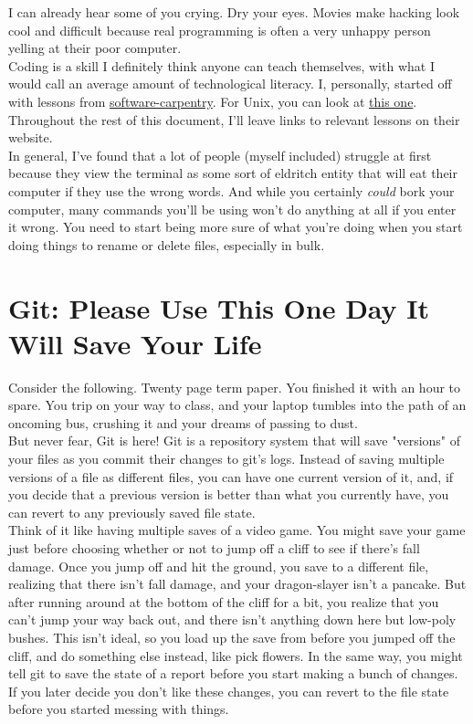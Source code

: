 \documentclass[letterpaper]{article}
\begin{document}
I can already hear some of you crying.  Dry your eyes.  Movies make hacking look cool and difficult because real programming is often a very unhappy person yelling at their poor computer.\\

Coding is a skill I definitely think anyone can teach themselves, with what I would call an average amount of technological literacy.  I, personally, started off with lessons from \href{https://software-carpentry.org/lessons/}{software-carpentry}.  For Unix, you can look at \href{http://swcarpentry.github.io/shell-novice/}{this one}.  Throughout the rest of this document, I'll leave links to relevant lessons on their website.\\

In general, I've found that a lot of people (myself included) struggle at first because they view the terminal as some sort of eldritch entity that will eat their computer if they use the wrong words.  And while you certainly \emph{could} bork your computer, many commands you'll be using won't do anything at all if you enter it wrong.  You need to start being more sure of what you're doing when you start doing things to rename or delete files, especially in bulk.

\section{Git: Please Use This One Day It Will Save Your Life}

Consider the following.  Twenty page term paper.  You finished it with an hour to spare.  You trip on your way to class, and your laptop tumbles into the path of an oncoming bus, crushing it and your dreams of passing to dust.\\

But never fear, Git is here!  Git is a repository system that will save "versions" of your files as you commit their changes to git's logs.  Instead of saving multiple versions of a file as different files, you can have one current version of it, and, if you decide that a previous version is better than what you currently have, you can revert to any previously saved file state.\\

Think of it like having multiple saves of a video game.  You might save your game just before choosing whether or not to jump off a cliff to see if there's fall damage.  Once you jump off and hit the ground, you save to a different file, realizing that there isn't fall damage, and your dragon-slayer isn't a pancake.  But after running around at the bottom of the cliff for a bit, you realize that you can't jump your way back out, and there isn't anything down here but low-poly bushes.  This isn't ideal, so you load up the save from before you jumped off the cliff, and do something else instead, like pick flowers.  In the same way, you might tell git to save the state of a report before you start making a bunch of changes.  If you later decide you don't like these changes, you can revert to the file state before you started messing with things.\\
\end{document}

